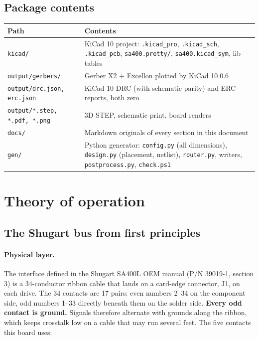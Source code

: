 \documentclass[11pt,a4paper]{article}
\begin{document}
\subsection{Package contents}
\begin{center}
\begin{tabular}{@{}p{55mm}p{105mm}@{}}
\toprule
Path & Contents\\
\midrule
\texttt{kicad/} & KiCad 10 project: \texttt{.kicad\_pro}, \texttt{.kicad\_sch}, \texttt{.kicad\_pcb}, \texttt{sa400.pretty/}, \texttt{sa400.kicad\_sym}, lib tables\\
\texttt{output/gerbers/} & Gerber X2 + Excellon plotted by KiCad 10.0.6\\
\texttt{output/drc.json, erc.json} & KiCad 10 DRC (with schematic parity) and ERC reports, both zero\\
\texttt{output/*.step, *.pdf, *.png} & 3D STEP, schematic print, board renders\\
\texttt{docs/} & Markdown originals of every section in this document\\
\texttt{gen/} & Python generator: \texttt{config.py} (all dimensions), \texttt{design.py} (placement, netlist), \texttt{router.py}, writers, \texttt{postprocess.py}, \texttt{check.ps1}\\
\bottomrule
\end{tabular}
\end{center}

\clearpage
\section{Theory of operation}\label{sec:theory}

\subsection{The Shugart bus from first principles}

\paragraph{Physical layer.}
The interface defined in the Shugart SA400L OEM manual (P/N 39019-1, section 3) is a 34-conductor ribbon
cable that lands on a card-edge connector, J1, on each drive. The 34 contacts are 17 pairs: even numbers
2--34 on the component side, odd numbers 1--33 directly beneath them on the solder side. \textbf{Every odd
contact is ground.} Signals therefore alternate with grounds along the ribbon, which keeps crosstalk low on
a cable that may run several feet. The five contacts this board uses:
\end{document}
